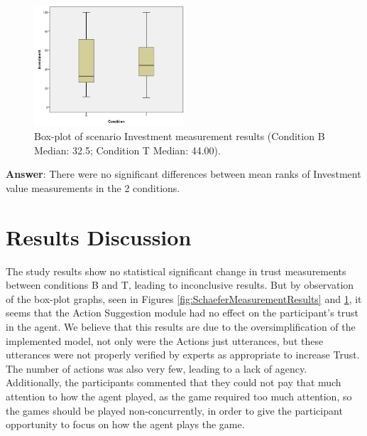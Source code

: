 \begin{figure}[hbt]
    \centering
    \includegraphics[width=0.5\textwidth]{graphs/InvestmentBoxPlot.png}
    \caption{Box-plot of scenario Investment measurement results (Condition B Median: 32.5; Condition T Median: 44.00).}
    \label{fig:InvestmentBoxPlot}
\end{figure}

\textbf{Answer}: There were no significant differences between mean ranks of Investment value measurements in the 2 conditions.

\section{Results Discussion}
The study results show no statistical significant change in trust measurements between conditions B and T, leading to inconclusive results. But by observation of the box-plot graphs, seen in Figures \ref{fig:SchaeferMeasurementResults} and \ref{fig:InvestmentBoxPlot}, it seems that the Action Suggestion module had no effect on the participant's trust in the agent.
We believe that this results are due to the oversimplification of the implemented model, not only were the Actions just utterances, but these utterances were not properly verified by experts as appropriate to increase Trust. The number of actions was also very few, leading to a lack of agency. Additionally, the participants commented that they could not pay that much attention to how the agent played, as the game required too much attention, so the games should be played non-concurrently, in order to give the participant opportunity to focus on how the agent plays the game.